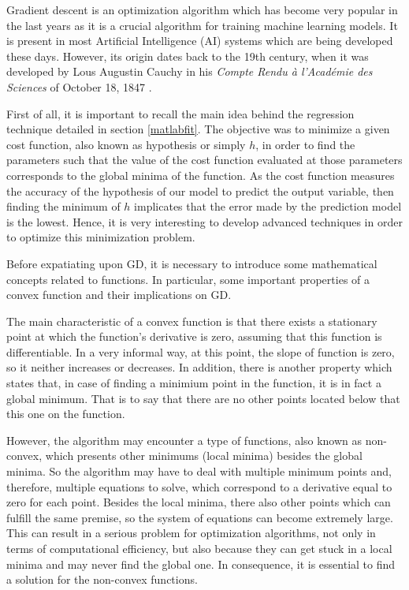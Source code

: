 \documentclass[a4paper, report, oneside, UKenglish]{memoir}
\begin{document}
Gradient descent is an optimization algorithm which has become very popular in the last years as it is a crucial algorithm for training machine learning models. It is present in most Artificial Intelligence (AI) systems which are being developed these days. However, its origin dates back to the 19th century, when it was developed by Lous Augustin Cauchy in his \textit{Compte Rendu à l’Académie des Sciences} of October 18, 1847 \cite{cauchy}.

First of all, it is important to recall the main idea behind the regression technique detailed in section \ref{matlabfit}. The objective was to minimize a given cost function, also known as hypothesis or simply $h$, in order to find the parameters such that the value of the cost function evaluated at those parameters corresponds to the global minima of the function. As the cost function measures the accuracy of the hypothesis of our model to predict the output variable, then finding the minimum of $h$ implicates that the error made by the prediction model is the lowest. Hence, it is very interesting to develop advanced techniques in order to optimize this minimization problem. 

Before expatiating upon GD, it is necessary to introduce some mathematical concepts related to functions. In particular, some important properties of a convex function and their implications on GD. 

The main characteristic of a convex function is that there exists a stationary point at which the function's derivative is zero, assuming that this function is differentiable. In a very informal way, at this point, the slope of function is zero, so it neither increases or decreases. In addition, there is another property which states that, in case of finding a minimium point in the function, it is in fact a global minimum. That is to say that there are no other points located below that this one on the function. 

However, the algorithm may encounter a type of functions, also known as non-convex, which presents other minimums (local minima) besides the global minima. So the algorithm may have to deal with multiple minimum points and, therefore, multiple equations to solve, which correspond to a derivative equal to zero for each point. Besides the local minima, there also other points which can fulfill the same premise, so the system of equations can become extremely large. This can result in a serious problem for optimization algorithms, not only in terms of computational efficiency, but also because they can get stuck in a local minima and may never find the global one. In consequence, it is essential to find a solution for the non-convex functions. 
\end{document}
